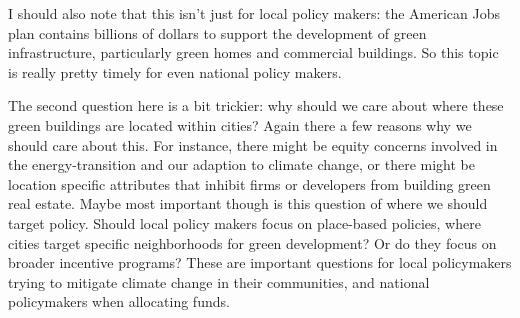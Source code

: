 \documentclass[11pt, dvipsnames, usenames, aspectratio=169]{beamer}
\begin{document}
{I should also note that this isn't just for local policy makers: the American Jobs plan contains billions of dollars to support the development of green infrastructure, particularly green homes and commercial buildings. So this topic is really pretty timely for even national policy makers.
\bigskip

The second question here is a bit trickier: why should we care about where these green buildings are located within cities? Again there a few reasons why we should care about this. For instance, there might be equity concerns involved in the energy-transition and our adaption to climate change, or  there might be location specific attributes that inhibit firms or developers from building green real estate. Maybe most important though is this question of where we should target policy. Should local policy makers focus on place-based policies, where cities target specific neighborhoods for green development? Or do they focus on broader incentive programs? These are important questions for local policymakers trying to mitigate climate change in their communities, and national policymakers when allocating funds.

}
\end{document}
